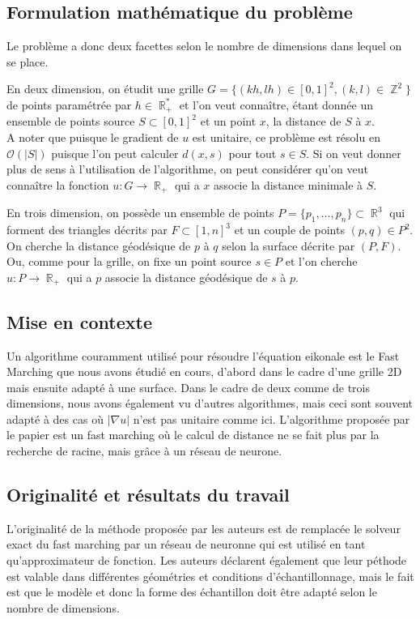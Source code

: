 \documentclass[11pt]{article} %
\DeclareMathOperator\Z{\mathbb{Z}}
\DeclareMathOperator\R{\mathbb{R}}
\begin{document}
\subsection{Formulation mathématique du problème}
Le problème a donc deux facettes selon le nombre de dimensions dans lequel on se place.

En deux dimension, on étudit une grille $G = \lbrace (kh, lh) \in \left[0, 1\right]^2 , (k, l) \in \Z^2 \rbrace$ de points paramétrée par $h \in \R_+^*$ et l'on veut connaître, étant donnée un ensemble de points source $S \subset \left[0, 1\right]^2$ et un point $x$, la distance de $S$ à $x$.\\
A noter que puisque le gradient de $u$ est unitaire, ce problème est résolu en $\mathcal{O}(\vert S \vert)$ puisque l'on peut calculer $d(x,s)$ pour tout $s \in S$. Si on veut donner plus de sens à l'utilisation de l'algorithme, on peut considérer qu'on veut connaître la fonction $u: G \rightarrow \R_+$ qui a $x$ associe la distance minimale à $S$.

En trois dimension, on possède un ensemble de points $P = \lbrace p_1, \dots, p_n \rbrace \subset \R^3$ qui forment des triangles décrits par $F \subset \left[1, n \right]^3$ et un couple de points $(p, q) \in P^2$. On cherche la distance géodésique de $p$ à $q$ selon la surface décrite par $(P, F)$. Ou, comme pour la grille, on fixe un point source $s \in P$ et l'on cherche $u : P \rightarrow \R_+$ qui a $p$ associe la distance géodésique de $s$ à $p$.

\subsection{Mise en contexte}
Un algorithme couramment utilisé pour résoudre l'équation eikonale est le Fast Marching \cite{FastMarching} que nous avons étudié en cours, d'abord dans le cadre d'une grille 2D mais ensuite adapté à une surface. Dans le cadre de deux comme de trois dimensions, nous avons également vu d'autres algorithmes, mais ceci sont souvent adapté à des cas où $| \nabla u |$ n'est pas unitaire comme ici. L'algorithme proposée par le papier est un fast marching où le calcul de distance ne se fait plus par la recherche de racine, mais grâce à un réseau de neurone.

\subsection{Originalité et résultats du travail}
L'originalité de la méthode proposée par les auteurs est de remplacée le solveur exact du fast marching par un réseau de neuronne qui est utilisé en tant qu'approximateur de fonction. Les auteurs déclarent également que leur péthode est valable dans différentes géométries et conditions d'échantillonnage, mais le fait est que le modèle et donc la forme des échantillon doit être adapté selon le nombre de dimensions.
\end{document}
